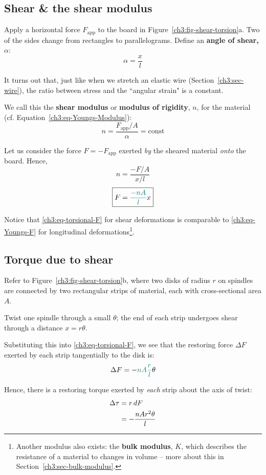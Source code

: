 \subsection{Shear \& the shear modulus}
Apply a horizontal force $F_\text{app}$ to the board in Figure~\ref{ch3:fig-shear-torsion}a. Two of the sides change from rectangles to parallelograms. Define an \textbf{angle of shear, $\alpha$}:
\[ \alpha = \frac{x}{l} \]

It turns out that, just like when we stretch an elastic wire (Section~\ref{ch3:sec-wire}), the ratio between stress and the ``angular strain" is a constant.

We call this the \textbf{shear modulus} or \textbf{modulus of rigidity}, $n$, for the material (cf. Equation~\ref{ch3:eq-Youngs-Modulus}):
\[  n= \frac{F_\text{app}/A}{\alpha} = \text{const} \]

Let us consider the force $F=-F_\text{app}$ exerted \emph{by} the sheared material \emph{onto} the board. Hence,
\[  n = \frac{-F/A}{x/l} \]
\begin{equation}
	\boxed{F = \textcolor{teal}{\frac{-nA}{l}} x}  \label{ch3:eq-torsional-F}
\end{equation}

Notice that \eqref{ch3:eq-torsional-F} for {shear deformations} is comparable to \eqref{ch3:eq-Youngs-F} for {longitudinal deformations}\footnote{Another modulus also exists: the \textbf{bulk modulus}, $K$, which describes the resistance of a material to changes in volume -- more about this in Section~\ref{ch3:sec-bulk-modulus}.}.

\subsection{Torque due to shear}
Refer to Figure~\ref{ch3:fig-shear-torsion}b, where two disks of radius $r$ on spindles are connected by two rectangular strips of material, each with cross-sectional area $A$.

Twist one spindle through a small $\theta$; the end of each strip undergoes shear through a distance $x=r\theta$. 

Substituting this into \eqref{ch3:eq-torsional-F}, we see that the restoring force $\Delta F$ exerted by each strip tangentially to the disk is:
\[ \Delta F = -\textcolor{teal}{nA\frac{r}{l}} \theta \]

Hence, there is a restoring torque exerted by \emph{each} strip about the axis of twist:
\begin{align*}
	\Delta\tau &= r\,dF  \notag \\
	&= -\frac{nAr^2\theta}{l} 
\end{align*}

